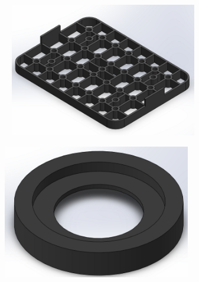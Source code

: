 \begin{figure}[htb]
\begin{subfigure}{.33\textwidth}
        \caption{}
        \label{fig:CAD_JT4}
    \end{subfigure}
    \centering
    \begin{subfigure}{.33\textwidth}\
        \centering
        \includegraphics[width = 0.9\textwidth]{Figures/Cap3/CAD_PRATO.png}
        \caption{}
        \label{fig:CAD_Prato}
    \end{subfigure}%
    \centering
    \begin{subfigure}{.33\textwidth}
        \centering
        \includegraphics[width = 0.9\textwidth]{Figures/Cap3/CAD_FALSA.png}
        \caption{}
        \label{fig:CAD_Falsa}
    \end{subfigure}
    \centering
    \begin{subfigure}{.33\textwidth}
        \centering

\end{subfigure}
\end{figure}
